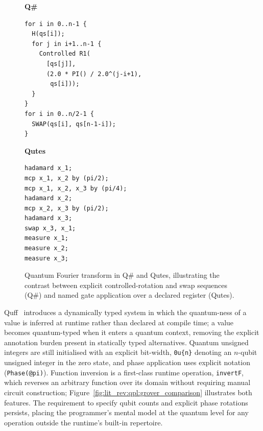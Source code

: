\begin{figure}[htbp]
    \centering
    \begin{minipage}[t]{0.48\textwidth}
        \textbf{Q\#}~\cite{MicrosoftQSharpOverview}
        \begin{lstlisting}[basicstyle=\scriptsize\ttfamily,
            frame=single, xleftmargin=2pt, xrightmargin=2pt, label={lst:lit_rev:qpl:qft_comparison:q\#}]
for i in 0..n-1 {
  H(qs[i]);
  for j in i+1..n-1 {
    Controlled R1(
      [qs[j]],
      (2.0 * PI() / 2.0^(j-i+1),
       qs[i]));
  }
}
for i in 0..n/2-1 {
  SWAP(qs[i], qs[n-1-i]);
}
        \end{lstlisting}
    \end{minipage}
    \hfill
    \begin{minipage}[t]{0.48\textwidth}
        \textbf{Qutes}~\cite{faro2025qutes}
        \begin{lstlisting}[basicstyle=\scriptsize\ttfamily,
            frame=single, xleftmargin=2pt, xrightmargin=2pt, label={lst:lit_rev:qpl:qft_comparison:qutes}]
hadamard x_1;
mcp x_1, x_2 by (pi/2);
mcp x_1, x_2, x_3 by (pi/4);
hadamard x_2;
mcp x_2, x_3 by (pi/2);
hadamard x_3;
swap x_3, x_1;
measure x_1;
measure x_2;
measure x_3;
        \end{lstlisting}
    \end{minipage}
    \caption{Quantum Fourier transform in Q\# and Qutes, illustrating the contrast between
    explicit controlled-rotation and swap sequences (Q\#) and named gate application over a
    declared register (Qutes).}
    \label{fig:lit_rev:qpl:qft_comparison}
\end{figure}

Quff~\cite{wright2024quff} introduces a dynamically typed system in which the quantum-ness of a value is inferred at runtime rather than declared at compile time; a value becomes quantum-typed when it enters a quantum context, removing the explicit annotation burden present in statically typed alternatives.
Quantum unsigned integers are still initialised with an explicit bit-width, \texttt{0u\{n\}} denoting an $n$-qubit unsigned integer in the zero state, and phase application uses explicit notation (\texttt{Phase(@pi)}).
Function inversion is a first-class runtime operation, \texttt{invertF}, which reverses an arbitrary function over its domain without requiring manual circuit construction; Figure~\ref{fig:lit_rev:qpl:grover_comparison} illustrates both features.
The requirement to specify qubit counts and explicit phase rotations persists, placing the programmer's mental model at the quantum level for any operation outside the runtime's built-in repertoire.

